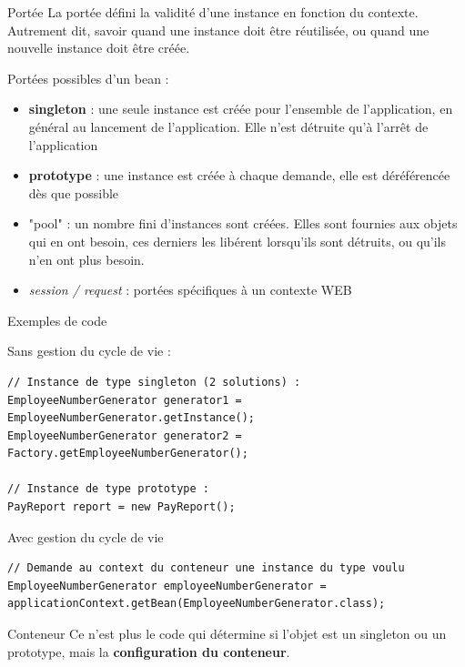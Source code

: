 \documentclass[compress]{beamer}%
\begin{document}
\begin{frame}

	\begin{block}{Portée}
		La portée défini la validité d'une instance en fonction du contexte. Autrement dit, savoir quand une instance doit être réutilisée, ou quand une nouvelle instance doit être créée.
	\end{block}

	\pause
	Portées possibles d'un bean :
	\begin{itemize}[<+->]
		\item \textbf{singleton} : une seule instance est créée pour l'ensemble de l'application, en général au lancement de l'application. Elle n'est détruite qu'à l'arrêt de l'application
		\item \textbf{prototype} : une instance est créée à chaque demande, elle est déréférencée dès que possible
		\item "pool" : un nombre fini d'instances sont créées. Elles sont fournies aux objets qui en ont besoin, ces derniers les libérent lorsqu'ils sont détruits, ou qu'ils n'en ont plus besoin.
		\item \emph{session / request} : portées spécifiques à un contexte WEB
	\end{itemize}
	
\end{frame}

\begin{frame}[fragile]{Exemples de code}

	 Sans gestion du cycle de vie : 
	\begin{lstlisting}
// Instance de type singleton (2 solutions) :
EmployeeNumberGenerator generator1 = EmployeeNumberGenerator.getInstance();
EmployeeNumberGenerator generator2 = Factory.getEmployeeNumberGenerator();

// Instance de type prototype :
PayReport report = new PayReport();
	\end{lstlisting}

	\pause
	Avec gestion du cycle de vie
	\begin{lstlisting}
// Demande au context du conteneur une instance du type voulu
EmployeeNumberGenerator employeeNumberGenerator = applicationContext.getBean(EmployeeNumberGenerator.class);
	\end{lstlisting}

	\pause
	\begin{block}{Conteneur}
		Ce n'est plus le code qui détermine si l'objet est un singleton ou un prototype, mais la \textbf{configuration du conteneur}.
	\end{block}

\end{frame}
\end{document}
